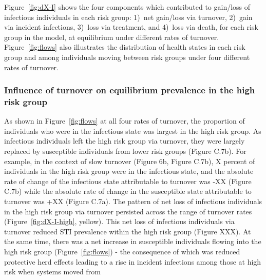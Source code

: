 \par
Figure~\ref{fig:dX-I} shows the four components which contributed to 
gain/loss of infectious individuals in each risk group:
1)~net gain/loss via turnover,
2)~gain via incident infections,
3)~loss via treatment, and
4)~loss via death,
for each risk group in the model,
at equilibrium under different rates of turnover.
Figure~\ref{fig:flows} also illustrates
the distribution of health states in each risk group
and among individuals moving between risk groups
under four different rates of turnover.
\subsubsection{Influence of turnover on equilibrium prevalence in the high risk group}		%
\label{sss:res-prev-high}
As shown in Figure~\ref{fig:flows} at all four rates of turnover,
the proportion of individuals 
who were in the infectious state was largest in the high risk group. 
As infectious individuals left
the high risk group via turnover, they were largely 
replaced by susceptible individuals from lower risk groups (Figure C.7b). 			%
For example, in the context of slow turnover (Figure 6b, Figure C.7b), 			%
X percent of individuals in the high risk group were in the infectious state,
and the absolute rate of change of the infectious state 
attributable to turnover was -XX (Figure C.7b) while the
absolute rate of change in the susceptible state attributable to 
turnover was +XX (Figure C.7a). The pattern of net loss of 
infectious individuals in the high risk group via turnover
persisted across the range of turnover rates (Figure~\ref{fig:dX-I-high}, yellow).			%
This net loss of infectious individuals via turnover 
reduced STI prevalence within the high risk group (Figure XXX). 					%
At the same time, 
there was a net increase in susceptible individuals flowing into the high risk group
(Figure~\ref{fig:flows}) - the consequence of which was reduced protective herd effects
leading to a rise in incident infections among those at high risk when systems moved from 
